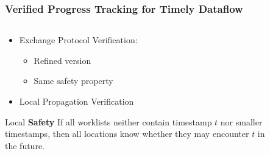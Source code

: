 \documentclass[aspectratio=169,10pt]{beamer}
\begin{document}
\begin{frame}
  \frametitle{Verified Progress Tracking for Timely Dataflow}
  \begin{columns}
    \begin{column}{.45\textwidth}
      \begin{itemize}
        \item Exchange Protocol Verification:
              \begin{itemize}
                \item Refined version
                \item Same safety property
              \end{itemize}
              \pause
        \item Local Propagation Verification
      \end{itemize}
              \begin{block}{Local \textbf{Safety}}
                If all worklists neither contain timestamp $t$ nor smaller timestamps, then all locations know whether they may encounter $t$ in the future.
              \end{block}
    \end{column}
    \begin{column}{.45\textwidth}
      \begin{figure}
      \end{figure}
    \end{column}
  \end{columns}
\end{frame}
\end{document}
